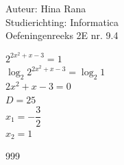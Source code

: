 \documentclass[a4paper]{article}
\begin{document}
\noindent \large Auteur: Hina Rana \\
\noindent \large Studierichting: Informatica\\
\noindent \large Oefeningenreeks 2E nr. 9.4\\

\medskip

\normalsize

$2^{2x^2+x-3}=1$\\

$\log_2 2^{2x^2+x-3} = \log_2 1$\\

$2x^2+x-3 = 0$\\

$D = 25$\\

$x_1= -\dfrac{3}{2}$\\

$x_2 = 1$




\begin{thebibliography}{999}
\end{thebibliography}
\end{document}
